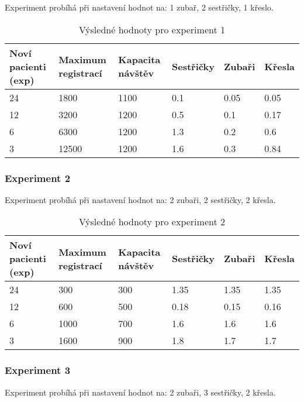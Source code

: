 \documentclass[a4paper,11pt,titlepage]{article}
\begin{document}
Experiment probíhá při nastavení hodnot na: 1 zubař, 2 sestřičky, 1 křeslo.

\begin{table}[h!]
\centering
\begin{tabular}{|l|l|l|l|l|l|}
\hline
Noví pacienti (exp) & Maximum registrací &  Kapacita návštěv & Sestřičky & Zubaři & Křesla \\ \hline
24       & 1800                	& 1100  & 0.1 & 0.05 & 0.05       	 \\ \hline
12       & 3200        		& 1200  & 0.5 & 0.1 & 0.17             	 \\ \hline
6        & 6300			& 1200  & 1.3 & 0.2 & 0.6     	 	 \\ \hline
3        & 12500		& 1200  & 1.6 & 0.3 & 0.84       	 \\ \hline
\end{tabular}
\caption {Výsledné hodnoty pro experiment 1} \label{tab:title} 
\end{table}

\subsubsection{Experiment 2}

Experiment probíhá při nastavení hodnot na: 2 zubaři, 2 sestřičky, 2 křesla.

\begin{table}[h!]
\centering
\begin{tabular}{|l|l|l|l|l|l|}
\hline
Noví pacienti (exp) & Maximum registrací &  Kapacita návštěv & Sestřičky & Zubaři & Křesla \\ \hline
24       & 300                	& 300  & 1.35 & 1.35 & 1.35       	 \\ \hline
12       & 600        		& 500  & 0.18 & 0.15 & 0.16           	 \\ \hline
6        & 1000			& 700  & 1.6 & 1.6 & 1.6     	 	 \\ \hline
3        & 1600			& 900  & 1.8 & 1.7 & 1.7       	 \\ \hline
\end{tabular}
\caption {Výsledné hodnoty pro experiment 2} \label{tab:title} 
\end{table}

\subsubsection{Experiment 3}

Experiment probíhá při nastavení hodnot na: 2 zubaři, 3 sestřičky, 2 křesla.
\end{document}
